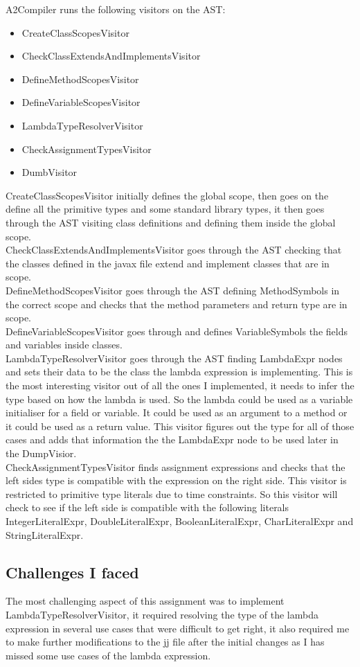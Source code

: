 \documentclass[twocolumn,notitlepage]{report}
\begin{document}
A2Compiler runs the following visitors on the AST:
\begin{itemize}
\item CreateClassScopesVisitor
\item CheckClassExtendsAndImplementsVisitor
\item DefineMethodScopesVisitor
\item DefineVariableScopesVisitor
\item LambdaTypeResolverVisitor
\item CheckAssignmentTypesVisitor
\item DumbVisitor
\end{itemize}
CreateClassScopesVisitor initially defines the global scope, then goes on the
define all the primitive types and some standard library types, it then goes
through the AST visiting class definitions and defining them inside the global
scope.\\
CheckClassExtendsAndImplementsVisitor goes through the AST checking that the
classes defined in the javax file extend and implement classes that are in
scope.\\
DefineMethodScopesVisitor goes through the AST defining MethodSymbols in the
correct scope and checks that the method parameters and return type are in
scope.\\
DefineVariableScopesVisitor goes through and defines VariableSymbols the fields
and variables inside classes.\\
LambdaTypeResolverVisitor goes through the AST finding LambdaExpr nodes and
sets their data to be the class the lambda expression is implementing. This is
the most interesting visitor out of all the ones I implemented, it needs to
infer the type based on how the lambda is used. So the lambda could be used as
a variable initialiser for a field or variable. It could be used as an argument
to a method or it could be used as a return value. This visitor figures out the
type for all of those cases and adds that information the the LambdaExpr node
to be used later in the DumpVisior.\\
CheckAssignmentTypesVisitor finds assignment expressions and checks that the
left sides type is compatible with the expression on the right side. This
visitor is restricted to primitive type literals due to time constraints.  So
this visitor will check to see if the left side is compatible with the
following literals IntegerLiteralExpr, DoubleLiteralExpr, BooleanLiteralExpr,
CharLiteralExpr and StringLiteralExpr.

\subsection*{Challenges I faced}
The most challenging aspect of this assignment was to implement
LambdaTypeResolverVisitor, it required resolving the type of the lambda
expression in several use cases that were difficult to get right, it also
required me to make further modifications to the jj file after the initial
changes as I has missed some use cases of the lambda expression.




\end{document}
